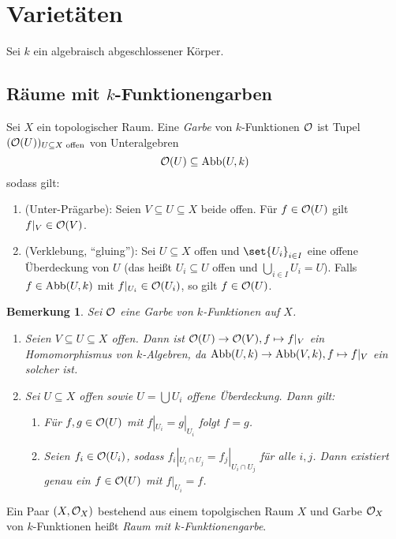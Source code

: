 \documentclass[12pt,a4paper]{scrartcl}
\theoremstyle{cplain}
\theoremstyle{cdef}
\newtheorem{beme}[thmcounter]{Bemerkung}
\begin{document}
\section{Varietäten}
Sei $k$ ein algebraisch abgeschlossener Körper.
\subsection{Räume mit $k$-Funktionengarben}
\begin{defi}
	Sei $X$ ein topologischer Raum. Eine \emph{Garbe} von $k$-Funktionen $\mathcal{O}$ ist Tupel $(\mathcal{O}(U))_{U\subseteq X \text{ offen}}$ von Unteralgebren
	\[\mathcal{O}(U)\subseteq \operatorname{Abb}(U,k)\]
	sodass gilt:
	\begin{enumerate}
		\item (Unter-Prägarbe): Seien $V\subseteq U\subseteq X$ beide offen. Für $f\in\mathcal{O}(U)$ gilt $f|_V \in \mathcal{O}(V)$.
		\item (Verklebung, \enquote{gluing}): Sei $U\subseteq X$ offen und $\set{U_i}_{i\in I}$ eine offene Überdeckung von $U$ (das heißt $U_i\subseteq U$ offen und $\bigcup_{i\in I} U_i = U$). Falls $f\in\operatorname{Abb}(U,k)$ mit $f|_{U_i}\in\mathcal{O}(U_i)$, so gilt $f \in\mathcal{O}(U)$.
	\end{enumerate}
\end{defi}
\begin{beme}
	Sei $\mathcal{O}$ eine Garbe von $k$-Funktionen auf $X$.
	\begin{enumerate}
		\item Seien $V\subseteq U\subseteq X$ offen. Dann ist $\mathcal{O}(U)\to \mathcal{O}(V), f\mapsto f|_V$ ein Homomorphismus von $k$-Algebren, da $\operatorname{Abb}(U,k)\to \operatorname{Abb}(V,k), f\mapsto f|_V$ ein solcher ist.
		\item Sei $U\subseteq X$ offen sowie $U = \bigcup U_i$ offene Überdeckung. Dann gilt:
		\begin{enumerate}
			\item Für $f,g\in\mathcal{O}(U)$ mit $f|_{U_i} = g|_{U_i}$ folgt $f = g$.
			\item Seien $f_i\in\mathcal{O}(U_i)$, sodass $f_i|_{U_i\cap U_j} = f_j|_{U_i\cap U_j}$ für alle $i,j$. Dann existiert genau ein $f\in\mathcal{O}(U)$ mit $f|_{U_i} = f$. 
		\end{enumerate}
	\end{enumerate}
\end{beme}

\begin{defi}
	Ein Paar $(X, \mathcal{O}_X)$ bestehend aus einem topolgischen Raum $X$ und Garbe $\mathcal{O}_X$ von $k$-Funktionen heißt \emph{Raum mit $k$-Funktionengarbe}. 
\end{defi}
\end{document}
